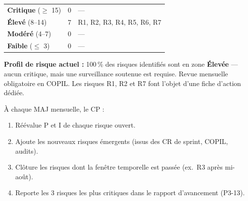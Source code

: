 \documentclass[11pt,a4paper,oneside]{report}
\begin{document}
\renewcommand{\arraystretch}{1.3}
\begin{tabularx}{\textwidth}{L{3cm} C{2.5cm} Y}
\toprule
{} &  &  \\
\midrule
{}\textbf{Critique} ($\geq$ 15)   & 0  & --- \\
\textbf{Élevé} (8--14)       & 7  & R1, R2, R3, R4, R5, R6, R7 \\
\textbf{Modéré} (4--7)        & 0  & --- \\
\textbf{Faible} ($\leq$ 3)    & 0  & --- \\
\bottomrule
\end{tabularx}

\vspace{4pt}
\begin{alert}
\textbf{Profil de risque actuel :} 100\,\% des risques identifiés sont en zone \textbf{Élevée} --- aucun critique, mais une surveillance soutenue est requise. Revue mensuelle obligatoire en COPIL. Les risques R1, R2 et R7 font l'objet d'une fiche d'action dédiée.
\end{alert}

\begin{reco}
À chaque MAJ mensuelle, le CP :
\begin{enumerate}
  \item Réévalue P et I de chaque risque ouvert.
  \item Ajoute les nouveaux risques émergents (issus des CR de sprint, COPIL, audits).
  \item Clôture les risques dont la fenêtre temporelle est passée (ex.\ R3 après mi-août).
  \item Reporte les 3 risques les plus critiques dans le rapport d'avancement (P3-13).
\end{enumerate}
\end{reco}
\end{document}
